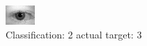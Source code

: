 \begin{figure}[h!]
\begin{center}
\includegraphics[width=0.60\columnwidth]{figures/ID540_class_2_target_3.png}
\end{center}
\caption{ Classification: 2 actual target: 3}
\label{fig:ID540_class_2_target_3}
\end{figure}
